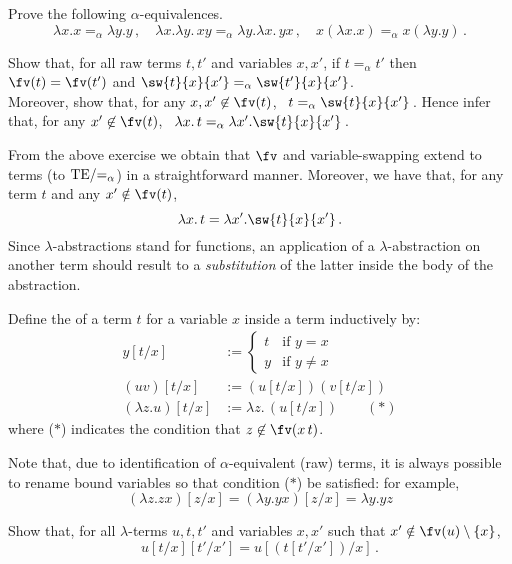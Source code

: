 \documentclass[12pt]{article}
\begin{document}
%
\begin{myexercise}
Prove the following $\alpha$-equivalences.
\[ \lambda x.x=_\alpha\lambda y.y\,,\quad \lambda x.\lambda y.\,xy=_\alpha\lambda y.\lambda x.\,yx\,,\quad x(\lambda x.x)=_\alpha x(\lambda y.y)\,. \]
\end{myexercise}
%
\begin{myexercise}
Show that, for all raw terms $t,t'$ and variables $x,x'$, if $t=_\alpha t'$ then $\fv(t)=\fv(t')$ and $\sw{t}{x}{x'}=_\alpha\sw{t'}{x}{x'}$.  \\
Moreover, show that, for any $x,x'\not\in\fv(t)$, \ $t=_\alpha\sw{t}{x}{x'}$\,. Hence infer that, for any $x'\not\in\fv(t)$, \ $\lambda
x.\,t=_\alpha\lambda x'.\sw{t}{x}{x'}$\,.
\end{myexercise}
%
From the above exercise we obtain that $\fv$ and variable-swapping extend to terms (\ie to $\mathrm{TE}/\mathnormal{=_\alpha}$) in a straightforward manner.
Moreover, we have that, for any term $t$ and any $x'\notin\fv(t)$,
\[ \lambda x.\,t= \lambda x'.\sw{t}{x}{x'}\,. \]
%
Since $\lambda$-abstractions stand for functions, an application of a $\lambda$-abstraction on
another term should result to a \emph{substitution} of the latter inside the body of the abstraction.
%
\begin{mydefinition}
Define the  of a term $t$ for a variable $x$ inside a term inductively by:
\begin{align*}
y[t/x]  &:=\begin{cases}t & \text{if }y=x \\ y & \text{if }y \neq x\end{cases} \\
(uv)[t/x] &:= (u[t/x])(v[t/x]) \\
(\lambda z. u) [t/x] &:= \lambda z.\, (u[t/x]) \qquad (\ast )
\end{align*}
where  ($*$) indicates the condition that  $z\not\in\fv(x\,t)$.\deq
\end{mydefinition}
Note that, due to identification of $\alpha$-equivalent (raw) terms, it is always possible to rename bound variables so that condition ($*$) be satisfied: for example,
\[ (\lambda z. zx) [z/x] = (\lambda y. yx) [z/x] = \lambda y. yz \]
\begin{myexercise}\label{ex:SubSub}
Show that, for all $\lambda$-terms $u,t,t'$ and variables $x,x'$ such that $x'\notin\fv(u)\setminus\{x\}$,
    \[ u[t/x][t'/x'] = u[(t[t'/x'])/x]\,. \]
\end{myexercise}
%
\end{document}
